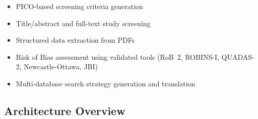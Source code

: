 \documentclass[11pt,a4paper]{article}
\begin{document}
\begin{itemize}[nosep]
  \item PICO-based screening criteria generation
  \item Title/abstract and full-text study screening
  \item Structured data extraction from PDFs
  \item Risk of Bias assessment using validated tools (RoB~2, ROBINS-I, QUADAS-2, Newcastle-Ottawa, JBI)
  \item Multi-database search strategy generation and translation
\end{itemize}

\subsection{Architecture Overview}
\end{document}
